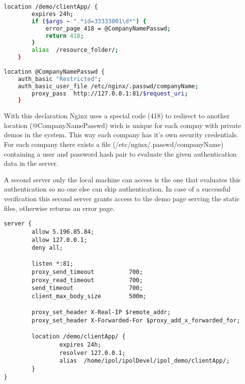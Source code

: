 \begin{lstlisting}[language=Bash]
location /demo/clientApp/ {
        expires 24h;
        if ($args ~ ".*id=33333001\d*") {
            error_page 418 = @CompanyNamePasswd;
            return 418;
        }
        alias  /resource_folder/;
    }
    
location @CompanyNamePasswd {
	auth_basic "Restricted";
	auth_basic_user_file /etc/nginx/.passwd/companyName;
        proxy_pass  http://127.0.0.1:81/$request_uri;
    }
 \end{lstlisting}

With this declaration Nginx uses a special code (418) to redirect to another location (@CompanyNamePasswd) wich is unique for each 
compay with private demos in the system. This way each company has it's own security credentials. For each company there exists a file
(/etc/nginx/.passwd/companyName) containing a user and password hash pair to evaluate the given authentication data in the server.

A second server only the local machine can access is the one that evaluates this authentication so no one else can skip authentication.
In case of a successful verification this second server grants access to the demo page serving the static files, otherwise returns an
error page.

\begin{lstlisting}
server {
        allow 5.196.85.84;
        allow 127.0.0.1;
        deny all;

        listen *:81;
        proxy_send_timeout          700;
        proxy_read_timeout          700;
        send_timeout                700;
        client_max_body_size        500m;

        proxy_set_header X-Real-IP $remote_addr;
        proxy_set_header X-Forwarded-For $proxy_add_x_forwarded_for;

        location /demo/clientApp/ {
                expires 24h;
                resolver 127.0.0.1;
                alias  /home/ipol/ipolDevel/ipol_demo/clientApp/;
        }
}
\end{lstlisting}